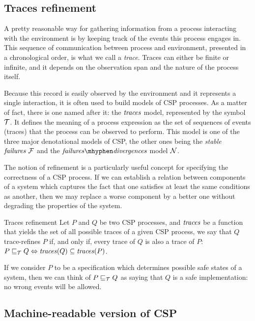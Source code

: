\subsection{Traces refinement}

A pretty reasonable way for gathering information from a process interacting with the environment is by keeping track of the events this process engages in. This sequence of communication between process and environment, presented in a chronological order, is what we call a \emph{trace}. Traces can either be finite or infinite, and it depends on the observation span and the nature of the process itself.

Because this record is easily observed by the environment and it represents a single interaction, it is often used to build models of CSP processes. As a matter of fact, there is one named after it: the $ \mathit{\traces} $ model, represented by the symbol $ \tmodel $. It defines the meaning of a process expression as the set of sequences of events (traces) that the process can be observed to perform. This model is one of the three major denotational models of CSP, the other ones being the \emph{stable} $ \mathit{\failures} \ \fmodel $ and the $ \mathit{\failures \mhyphen \divergences} $ model $ \nmodel $.

The notion of refinement is a particularly useful concept for specifying the correctness of a CSP process. If we can establish a relation between components of a system which captures the fact that one satisfies at least the same conditions as another, then we may replace a worse component by a better one without degrading the properties of the system.

\begin{definition}{Traces refinement}
	Let $ P $ and $ Q $ be two CSP processes, and $ \mathit{\traces} $ be a function that yields the set of all possible traces of a given CSP process, we say that $ Q $ trace-refines $ P $ if, and only if, every trace of $ Q $ is also a trace of $ P $: $ P \refinedby[\tmodel] Q \iff \mathit{\traces}(Q) \subseteq \mathit{\traces}(P) $.
\end{definition}

If we consider $ P $ to be a specification which determines possible safe states of a system, then we can think of $ P \refinedby[\tmodel] Q $ as saying that $ Q $ is a safe implementation: no wrong events will be allowed. 

\subsection{Machine-readable version of CSP}


